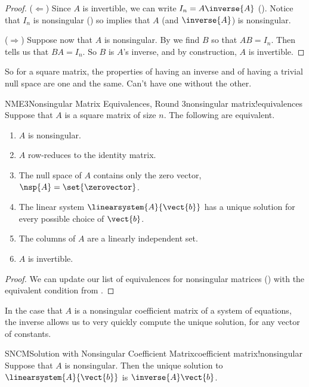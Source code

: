 %
\begin{proof}
($\Leftarrow$)  Since $A$ is invertible, we can write $I_n=A\inverse{A}$ ().  Notice that $I_n$ is nonsingular () so  implies that $A$ (and $\inverse{A}$) is nonsingular.\par
%
($\Rightarrow$)  Suppose now that $A$ is nonsingular.  By  we find $B$ so that $AB=I_n$.  Then  tells us that $BA=I_n$.  So $B$ is $A$'s inverse, and by construction, $A$ is invertible.
%
\end{proof}
%
So for a square matrix, the properties of having an inverse and of having a trivial null space are one and the same.  Can't have one without the other.
%
\begin{theorem}{NME3}{Nonsingular Matrix Equivalences, Round 3}{nonsingular matrix!equivalences}
Suppose that $A$ is a square matrix of size $n$.  The following are equivalent.
%
\begin{enumerate}
\item $A$ is nonsingular.
\item $A$ row-reduces to the identity matrix.
\item The null space of $A$ contains only the zero vector, $\nsp{A}=\set{\zerovector}$.
\item The linear system $\linearsystem{A}{\vect{b}}$ has a unique solution for every possible choice of $\vect{b}$.
\item The columns of $A$ are a linearly independent set.
\item $A$ is invertible.
\end{enumerate}
\end{theorem}
%
\begin{proof}
We can update our list of equivalences for nonsingular matrices () with the equivalent condition from .
\end{proof}
%
In the case that $A$ is a nonsingular coefficient matrix of a system of equations, the inverse allows us to very quickly compute the unique solution, for any vector of constants.
%
\begin{theorem}{SNCM}{Solution with Nonsingular Coefficient Matrix}{coefficient matrix!nonsingular}
Suppose that $A$ is nonsingular.  Then the unique solution to $\linearsystem{A}{\vect{b}}$ is $\inverse{A}\vect{b}$.
\end{theorem}
%
